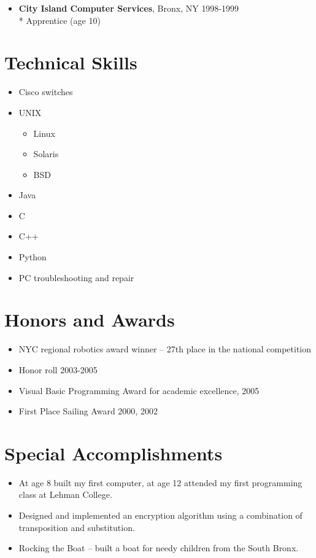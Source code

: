 \documentclass[margin]{res}
\begin{document}
\begin{resume}
\begin{itemize}
		\item {\bf City Island Computer Services}, Bronx, NY \hfill {\small
		1998-1999}
		\\* Apprentice (age 10)
	\end{itemize}

\section{\textsf{Technical Skills}}
	\begin{itemize} \itemsep -2pt
		\item Cisco switches
		\item UNIX
		\begin{itemize} \itemsep -2pt
			\item {\small Linux}
			\item {\small Solaris}
			\item {\small BSD}
		\end{itemize}
		\item Java
		\item C
		\item C++
		\item Python
		\item PC troubleshooting and repair
	 \end{itemize}

\section{\textsf{Honors and Awards}}
	\begin{itemize} \itemsep -2pt
		\item NYC regional robotics award winner – 27th place in the national competition
		\item Honor roll 2003-2005
		\item Visual Basic Programming Award for academic excellence, 2005
		\item First Place Sailing Award 2000, 2002
	\end{itemize}

\section{\textsf{Special Accomplishments}}
	\begin{itemize} \itemsep -2pt
		\item At age 8 built my first computer, at age 12 attended my first programming class at Lehman College.
		\item Designed and implemented an encryption algorithm using a combination of transposition and substitution.
		\item Rocking the Boat – built a boat for needy children from the South Bronx.
	\end{itemize}


\end{resume}
\end{document}
